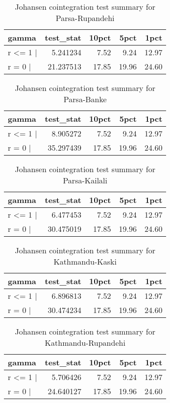 \documentclass[
  12pt,
]{article}
\begin{document}
\begin{longtable}[t]{lrrrr}
\caption{\label{tab:rice-cajo-test}Johansen cointegration test summary for Parsa-Rupandehi}\\
\toprule
gamma & test\_stat & 10pct & 5pct & 1pct\\
\midrule
r <= 1 | & 5.241234 & 7.52 & 9.24 & 12.97\\
r = 0  | & 21.237513 & 17.85 & 19.96 & 24.60\\
\bottomrule
\end{longtable}

\begin{longtable}[t]{lrrrr}
\caption{\label{tab:rice-cajo-test}Johansen cointegration test summary for Parsa-Banke}\\
\toprule
gamma & test\_stat & 10pct & 5pct & 1pct\\
\midrule
r <= 1 | & 8.905272 & 7.52 & 9.24 & 12.97\\
r = 0  | & 35.297439 & 17.85 & 19.96 & 24.60\\
\bottomrule
\end{longtable}

\begin{longtable}[t]{lrrrr}
\caption{\label{tab:rice-cajo-test}Johansen cointegration test summary for Parsa-Kailali}\\
\toprule
gamma & test\_stat & 10pct & 5pct & 1pct\\
\midrule
r <= 1 | & 6.477453 & 7.52 & 9.24 & 12.97\\
r = 0  | & 30.475019 & 17.85 & 19.96 & 24.60\\
\bottomrule
\end{longtable}

\begin{longtable}[t]{lrrrr}
\caption{\label{tab:rice-cajo-test}Johansen cointegration test summary for Kathmandu-Kaski}\\
\toprule
gamma & test\_stat & 10pct & 5pct & 1pct\\
\midrule
r <= 1 | & 6.896813 & 7.52 & 9.24 & 12.97\\
r = 0  | & 30.474234 & 17.85 & 19.96 & 24.60\\
\bottomrule
\end{longtable}

\begin{longtable}[t]{lrrrr}
\caption{\label{tab:rice-cajo-test}Johansen cointegration test summary for Kathmandu-Rupandehi}\\
\toprule
gamma & test\_stat & 10pct & 5pct & 1pct\\
\midrule
r <= 1 | & 5.706426 & 7.52 & 9.24 & 12.97\\
r = 0  | & 24.640127 & 17.85 & 19.96 & 24.60\\
\bottomrule
\end{longtable}
\end{document}

